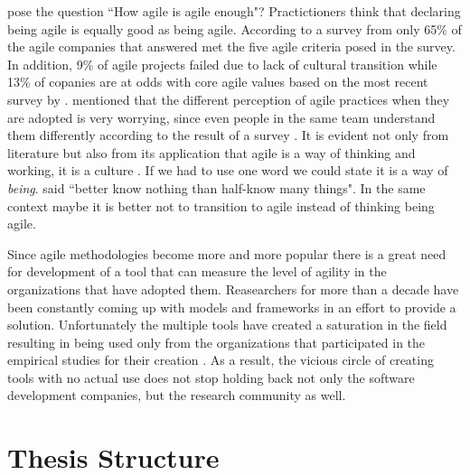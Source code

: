 \citet{comparative_agility} pose the question ``How agile is agile enough"? Practictioners think that declaring being agile is equally good as being agile. According to a survey from \citet{ambysoft} only 65\% of the agile companies that answered met the five agile criteria posed in the survey. In addition, 9\% of agile projects failed due to lack of cultural transition while 13\% of copanies are at odds with core agile values based on the most recent survey by \citet{versionOne}. \citet{poonacha} mentioned that the different perception of agile practices when they are adopted is very worrying, since even people in the same team understand them differently according to the result of a survey \cite{ambler}. It is evident not only from literature but also from its application that agile is a way of thinking and working, it is a culture \cite{poonacha}. If we had to use one word we could state it is a way of \textit{being}. \citet{Nietzsche} said ``better know nothing than half-know many things". In the same context maybe it is better not to transition to agile instead of thinking being agile. 

Since agile methodologies become more and more popular there is a great need for development of a tool that can measure the level of agility in the organizations that have adopted them. Reasearchers for more than a decade have been constantly coming up with models and frameworks in an effort to provide a solution. Unfortunately the multiple tools have created a saturation in the field resulting in being used only from the organizations that participated in the empirical studies for their creation \cite{samireh_jalali_dissertation}. As a result, the vicious circle of creating tools with no actual use does not stop holding back not only the software development companies, but the research community as well.


\section{Thesis Structure}







